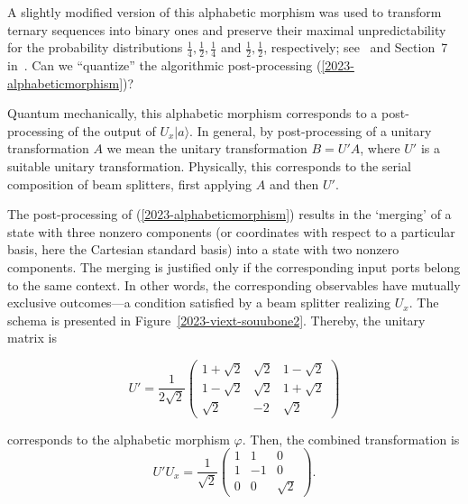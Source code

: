 \documentclass[%
 superscriptaddress,
  preprint,
 showpacs,
 showkeys,
 nofootinbib,
  amsmath,amssymb,
 pra,
  longbibliography,
  floatfix,
 ]{revtex4-2}
\theoremstyle{definition}
\begin{document}
  A slightly modified version of this alphabetic morphism
 was used to
 transform ternary sequences into binary ones and preserve their maximal unpredictability
 for the probability distributions  $\frac{1}{4},\frac{1}{2},\frac{1}{4}$ and $\frac{1}{2},\frac{1}{2}$, respectively;
see~\cite{CALUDE202131} and Section~7 in~\cite{aguero_trejo_new_2021}. Can we ``quantize'' the algorithmic post-processing (\ref{2023-alphabeticmorphism})?




Quantum mechanically, this alphabetic morphism corresponds to a post-processing of the output of $U_x\vert a \rangle$.
In general, by
post-processing of a  unitary transformation $A$ we mean the unitary transformation $B = U'A$, where $U'$ is a suitable unitary transformation.
Physically, this corresponds to the serial composition of beam splitters, first applying $A$ and then $U'$.

The post-processing of (\ref{2023-alphabeticmorphism}) results in the `merging'
of a state with three nonzero components
(or coordinates with respect to a particular basis, here the Cartesian standard basis)
into a state with two
nonzero components. The merging is justified only if the corresponding input ports belong to the same context.
In other words, the corresponding observables have mutually exclusive outcomes---a condition satisfied by a beam splitter realizing $U_x$.
The schema is presented in Figure~\ref{2023-viext-souubone2}.
Thereby,  the unitary matrix is

\begin{equation}
U' =\frac{1}{2\sqrt2}
\begin{pmatrix}
1+\sqrt2& \sqrt2 & 1-\sqrt2\\
1-\sqrt2 & \sqrt2 & 1+\sqrt2 \\
\sqrt2 & -2 & \sqrt2
\end{pmatrix}
\label{2023-viext-upux}
\end{equation}

\noindent corresponds to the alphabetic morphism $\varphi$.
Then, the combined transformation is
\begin{equation}
U'U_x =
\frac{1}{\sqrt{2}}
\begin{pmatrix}
1&1&0\\
1&-1&0\\
0&0&\sqrt{2}
\end{pmatrix}
.
\label{2023-viext-u}
\end{equation}
\end{document}
